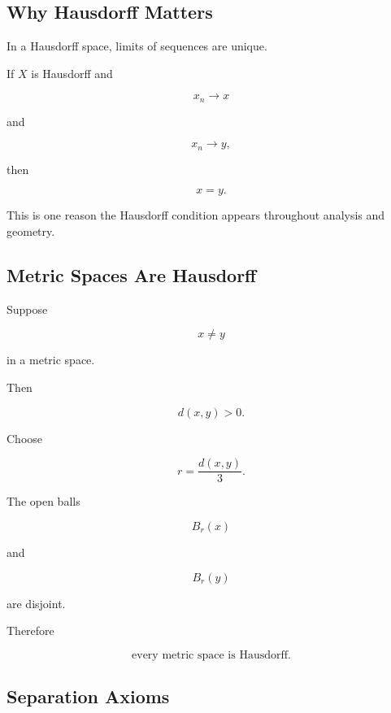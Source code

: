 \subsection{Why Hausdorff Matters}
\label{subsec:why-hausdorff-matters}

In a Hausdorff space, limits of sequences are unique.

\begin{theorem}
If \(X\) is Hausdorff and

\[
x_n\to x
\]

and

\[
x_n\to y,
\]

then

\[
\boxed{x=y.}
\]
\end{theorem}

This is one reason the Hausdorff condition appears throughout analysis and
geometry.

\subsection{Metric Spaces Are Hausdorff}
\label{subsec:metric-spaces-hausdorff}

Suppose

\[
x\neq y
\]

in a metric space.

Then

\[
d(x,y)>0.
\]

Choose

\[
r=\frac{d(x,y)}{3}.
\]

The open balls

\[
B_r(x)
\]

and

\[
B_r(y)
\]

are disjoint.

Therefore

\[
\boxed{
\text{every metric space is Hausdorff}.
}
\]

\subsection{Separation Axioms}
\label{subsec:separation-axioms}

